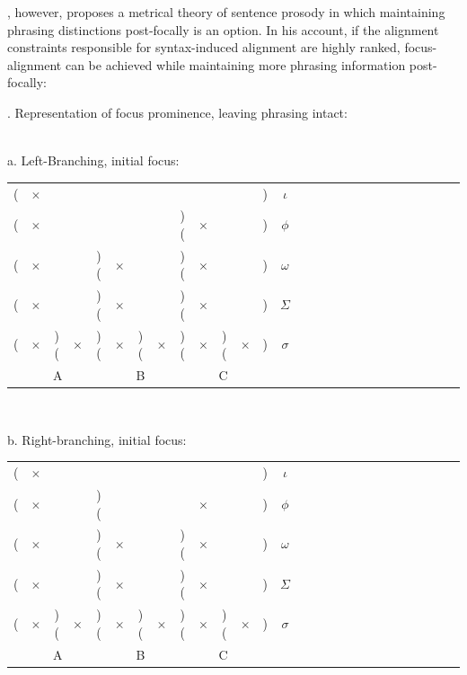 \documentclass[preprint,review,12pt,authoryear,times]{elsarticle}
\newcommand{\g}{$\times$}
\begin{document}
\citet{truck95}, however, proposes a metrical theory of sentence prosody in which maintaining phrasing distinctions post-focally is an option. In his account, if the alignment constraints responsible for syntax-induced alignment are highly ranked, focus-alignment can be achieved while maintaining more phrasing information post-focally:



\ex. Representation of focus prominence, leaving phrasing intact:\\\label{focusrep}
\vspace{-10pt}
\ \\
\parbox{2in}{\footnotesize a. Left-Branching, initial focus:\\
\vspace{-12pt}
\setlength{\unitlength}{1cm}
\setlength\extrarowheight{-3pt}
\begin{tabular}{ccccccccccccccccccccccccccc}
 (&\g&&&&&&&&&&&)&\em $\iota$\\
(&\g&&&&&&&)(&\g&&&)&$\phi$\\
(&\g&&&)(&\g&&&)(&\g&&&)&$\omega$\\
(&\g&&&)(&\g&&&)(&\g&&&)&$\Sigma$\\
(&\g&)(&\g&)(&\g&)(&\g&)(&\g&)(&\g&)&$\sigma$\\
\multicolumn{5}{c}{A}&\multicolumn{3}{c}{B}&\multicolumn{5}{c}{C}\\
\end{tabular}
 }
 \vspace{10pt}
  \ \\
\parbox{2in}{\footnotesize b. Right-branching, initial focus:\\
\vspace{-12pt}
\setlength{\unitlength}{1cm}
\setlength\extrarowheight{-3pt}
\begin{tabular}{ccccccccccccccccccccccccccc}
(&\g&&&&&&&&&&&)&\em $\iota$\\
(&\g&&&)(&&&&&\g&&&)&$\phi$\\
(&\g&&&)(&\g&&&)(&\g&&&)&$\omega$\\
(&\g&&&)(&\g&&&)(&\g&&&)&$\Sigma$\\
(&\g&)(&\g&)(&\g&)(&\g&)(&\g&)(&\g&)&$\sigma$\\
\multicolumn{5}{c}{A}&\multicolumn{3}{c}{B}&\multicolumn{5}{c}{C}\\
\end{tabular}
}\label{feryfocus}
\end{document}
